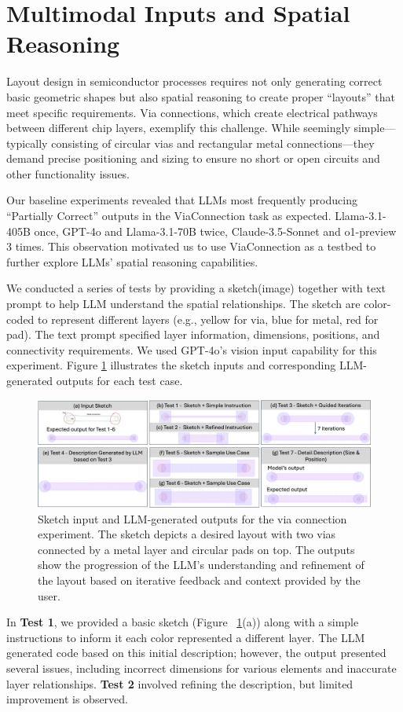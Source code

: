 \documentclass{article}
\begin{document}
\section{Multimodal Inputs and Spatial Reasoning}
Layout design in semiconductor processes requires not only generating correct basic geometric shapes but also spatial reasoning to create proper ``layouts'' that meet specific requirements. Via connections, which create electrical pathways between different chip layers, exemplify this challenge. While seemingly simple—typically consisting of circular vias and rectangular metal connections—they demand precise positioning and sizing to ensure no short or open circuits and other functionality issues.

Our baseline experiments revealed that LLMs most frequently producing ``Partially Correct'' outputs in the ViaConnection task as expected. Llama-3.1-405B once, GPT-4o and Llama-3.1-70B twice, Claude-3.5-Sonnet and o1-preview 3 times. This observation motivated us to use ViaConnection as a testbed to further explore LLMs' spatial reasoning capabilities.

We conducted a series of tests by providing a sketch(image) together with text prompt to help LLM understand the spatial relationships. The sketch are color-coded to represent different layers (e.g., yellow for via, blue for metal, red for pad). The text prompt specified layer information, dimensions, positions, and connectivity requirements. We used GPT-4o's vision input capability for this experiment. Figure \ref{fig:via_experiment} illustrates the sketch inputs and corresponding LLM-generated outputs for each test case.

\begin{figure}[!h]
\centering
\includegraphics[width=1\linewidth]{Figure1_v4.png}
\caption{Sketch input and LLM-generated outputs for the via connection experiment. The sketch depicts a desired layout with two vias connected by a metal layer and circular pads on top. The outputs show the progression of the LLM's understanding and refinement of the layout based on iterative feedback and context provided by the user.}
\label{fig:via_experiment}
\end{figure}
In \textbf{Test 1}, we provided a basic sketch (Figure ~\ref{fig:via_experiment}(a)) along with a simple instructions to inform it each color represented a different layer. The LLM generated code based on this initial description; however, the output presented several issues, including incorrect dimensions for various elements and inaccurate layer relationships. \textbf{Test 2} involved refining the description, but limited improvement is observed. 
\end{document}
